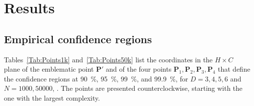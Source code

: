 \section{Results}\label{Sec:Results}

\subsection{Empirical confidence regions}

Tables~\ref{Tab:Points1k} and~\ref{Tab:Points50k} list the coordinates in the $H\times C$ plane
of the emblematic point $\bm P'$ and of the four points $\bm P_1,\bm P_2,\bm P_3,\bm P_4$ that define the confidence regions at \SI{90}{\percent}, \SI{95}{\percent}, \SI{99}{\percent}, and \SI{99.9}{\percent}, 
for $D=3,4,5,6$ and $N=1000,50000$, .
The points are presented counterclockwise, starting with the one with the largest complexity. 

